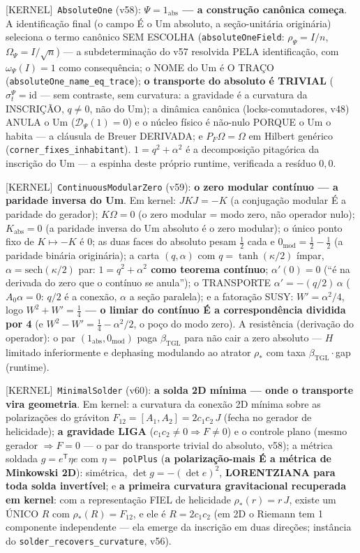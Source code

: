 \documentclass[11pt]{article}
\providecommand{\kernelmk}[1]{\textsf{[KERNEL]}~\texttt{#1}}\providecommand{\knownmk}[1]{\textsf{[KNOWN]}~{#1}}\providecommand{\statusmk}[1]{\textsf{[#1]}}
\newcommand{\bTGL}{\beta_{\mathrm{TGL}}}\newcommand{\Msun}{M_{\odot}}\newcommand{\TGL}{\mathrm{TGL}}
\theoremstyle{definition}\newtheorem{deriv}{Derivação}
\begin{document}
\kernelmk{AbsoluteOne} (v58): \textbf{$\Psi=1_{\mathrm{abs}}$ --- a construção canônica começa}. A identificação final (o campo É o Um absoluto, a seção-unitária originária) seleciona o termo canônico SEM ESCOLHA (\texttt{absoluteOneField}: $\rho_\Psi=I/n$, $\Omega_\Psi=I/\sqrt n$) --- a subdeterminação do v57 resolvida PELA identificação, com $\omega_\Psi(I)=1$ como consequência; o NOME do Um é O TRAÇO (\texttt{absoluteOne\_name\_eq\_trace}); \textbf{o transporte do absoluto é TRIVIAL} ($\sigma^\Psi_t=\mathrm{id}$ --- sem contraste, sem curvatura: a gravidade é a curvatura da INSCRIÇÃO, $q\neq0$, não do Um); a dinâmica canônica (locks-comutadores, v48) ANULA o Um ($\mathcal D_\Psi(1)=0$) e o núcleo físico é não-nulo PORQUE o Um o habita --- a cláusula de Breuer DERIVADA; e $P_F\Omega=\Omega$ em Hilbert genérico (\texttt{corner\_fixes\_inhabitant}). $1=q^2+\alpha^2$ é a decomposição pitagórica da inscrição do Um --- a espinha deste próprio runtime, verificada a resíduo $0{,}0$.

\kernelmk{ContinuousModularZero} (v59): \textbf{o zero modular contínuo --- a paridade inversa do Um}. Em kernel: $JKJ=-K$ (a conjugação modular É a paridade do gerador); $K\Omega=0$ (o zero modular = modo zero, não operador nulo); $K_{\mathrm{abs}}=0$ (a paridade inversa do Um absoluto é o zero modular); o único ponto fixo de $K\mapsto-K$ é $0$; as duas faces do absoluto pesam $\tfrac12$ cada e $0_{\mathrm{mod}}=\tfrac12-\tfrac12$ (a paridade binária originária); a carta $(q,\alpha)$ com $q=\tanh(\kappa/2)$ ímpar, $\alpha=\mathrm{sech}(\kappa/2)$ par: \textbf{$1=q^2+\alpha^2$ como teorema contínuo}; $\alpha'(0)=0$ (``é na derivada do zero que o contínuo se anula''); o TRANSPORTE $\alpha'=-(q/2)\,\alpha$ ($A_0\alpha=0$: $q/2$ é a conexão, $\alpha$ a seção paralela); e a fatoração SUSY: $W'=\alpha^2/4$, logo \textbf{$W^2+W'=\tfrac14$ --- o limiar do contínuo É a correspondência dividida por 4} (e $W^2-W'=\tfrac14-\alpha^2/2$, o poço do modo zero). A resistência (derivação do operador): o par $(1_{\mathrm{abs}},0_{\mathrm{mod}})$ paga $\bTGL$ para não cair a zero absoluto --- $H$ limitado inferiormente e dephasing modulando ao atrator $\rho_*$ com taxa $\bTGL\cdot$gap (runtime).

\kernelmk{MinimalSolder} (v60): \textbf{a solda 2D mínima --- onde o transporte vira geometria}. Em kernel: a curvatura da conexão 2D mínima sobre as polarizações do gráviton $F_{12}=[A_1,A_2]=2c_1c_2\,J$ (fecha no gerador de helicidade); \textbf{a gravidade LIGA} ($c_1c_2\neq0\Rightarrow F\neq0$) e o controle plano (mesmo gerador $\Rightarrow F=0$ --- o par do transporte trivial do absoluto, v58); a métrica soldada $g=e^\mathsf{T}\eta e$ com $\eta=$ \texttt{polPlus} (\textbf{a polarização-mais É a métrica de Minkowski 2D}): simétrica, $\det g=-(\det e)^2$, \textbf{LORENTZIANA para toda solda invertível}; e \textbf{a primeira curvatura gravitacional recuperada em kernel}: com a representação FIEL de helicidade $\rho_*(r)=r\,J$, existe um ÚNICO $R$ com $\rho_*(R)=F_{12}$, e ele é $R=2c_1c_2$ (em 2D o Riemann tem 1 componente independente --- ela emerge da inscrição em duas direções; instância do \texttt{solder\_recovers\_curvature}, v56).
\end{document}
